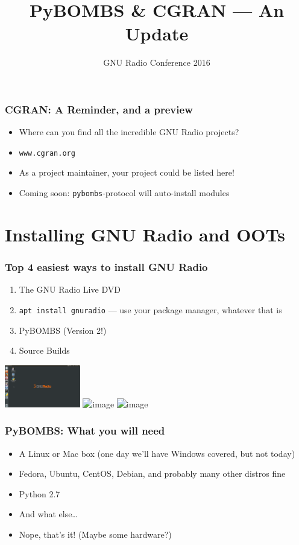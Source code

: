 \documentclass{beamer}
\title{PyBOMBS \& CGRAN --- An Update}
\institute{Martin Braun}
\date{GNU Radio Conference 2016}
\begin{document}
\frame{\titlepage}

\begin{frame}
  \frametitle{CGRAN\@: A Reminder, and a preview}
  \begin{itemize}
    \item Where can you find all the incredible GNU Radio projects?
    \item \texttt{www.cgran.org}
    \item As a project maintainer, your project could be listed here!
    \item Coming soon: \texttt{pybombs}-protocol will auto-install modules
  \end{itemize}
\end{frame}


\section{Installing GNU Radio and OOTs}
\begin{frame}
  \frametitle{Top 4 easiest ways to install GNU Radio}
  \begin{enumerate}
    \item The GNU Radio Live DVD
    \item<2-> \texttt{apt install gnuradio} --- use your package manager, whatever that is
    \item<3-> PyBOMBS (Version 2!)
    \item<4-> Source Builds
  \end{enumerate}
    \hspace{3em}
    \includegraphics[height=5em]{grlivedvd}
    \hspace{1em}
    \includegraphics<3->[height=5em]{pybombs_logo}
    \hspace{1em}
    \includegraphics<4->[height=5em]{srcbuild}
\end{frame}

\begin{frame}
  \frametitle{PyBOMBS\@: What you will need}
  \begin{itemize}
    \item A Linux or Mac box (one day we'll have Windows covered, but not today)
    \item Fedora, Ubuntu, CentOS, Debian, and probably many other distros fine
    \item Python 2.7
    \item<2-> And what else\ldots
    \item<3-> Nope, that's it! (Maybe some hardware?)
  \end{itemize}
\end{frame}
\end{document}
